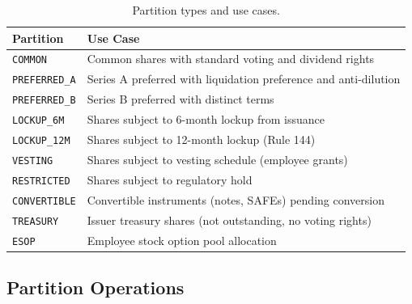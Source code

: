 \documentclass[11pt,a4paper]{article}
\begin{document}
\begin{table}[H]
\centering
\caption{Partition types and use cases.}
\label{tab:partitions}
\begin{tabular}{lp{7.5cm}}
\toprule
\textbf{Partition} & \textbf{Use Case} \\
\midrule
\texttt{COMMON} & Common shares with standard voting and dividend rights \\
\texttt{PREFERRED\_A} & Series A preferred with liquidation preference and anti-dilution \\
\texttt{PREFERRED\_B} & Series B preferred with distinct terms \\
\texttt{LOCKUP\_6M} & Shares subject to 6-month lockup from issuance \\
\texttt{LOCKUP\_12M} & Shares subject to 12-month lockup (Rule 144) \\
\texttt{VESTING} & Shares subject to vesting schedule (employee grants) \\
\texttt{RESTRICTED} & Shares subject to regulatory hold \\
\texttt{CONVERTIBLE} & Convertible instruments (notes, SAFEs) pending conversion \\
\texttt{TREASURY} & Issuer treasury shares (not outstanding, no voting rights) \\
\texttt{ESOP} & Employee stock option pool allocation \\
\bottomrule
\end{tabular}
\end{table}

\subsection{Partition Operations}
\end{document}
